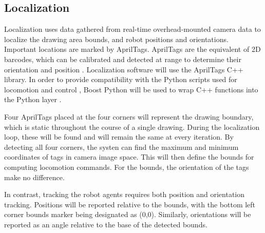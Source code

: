 
\subsection{Localization}
\label{sec:software_localization}
Localization uses data gathered from real-time overhead-mounted camera data to localize the drawing area bounds, and robot positions and orientations. Important locations are marked by AprilTags. AprilTags are the equivalent of 2D barcodes, which can be calibrated and detected at range to determine their orientation and position \cite{apriltags}. Localization software will use the AprilTags C++ library. In order to provide compatibility with the Python scripts used for locomotion and control , Boost Python will be used to wrap C++ functions into the Python layer \cite{python_boost}.

Four AprilTags placed at the four corners will represent the drawing boundary, which is static throughout the course of a single drawing. During the localization loop, these will be found and will remain the same at every iteration. By detecting all four corners, the systen can find the maximum and minimum coordinates of tags in camera image space. This will then define the bounds for computing locomotion commands. For the bounds, the orientation of the tags make no difference.

In contrast, tracking the robot agents requires both position and orientation tracking. Positions will be reported relative to the bounds, with the bottom left corner bounds marker being designated as (0,0). Similarly, orientations will be reported as an angle relative to the base of the detected bounds.
